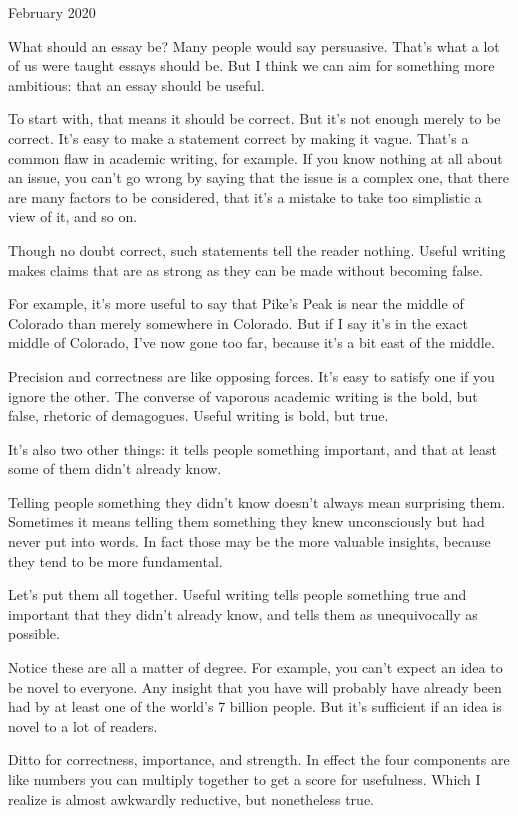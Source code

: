 February 2020

What should an essay be? Many people would say persuasive. That's what a
lot of us were taught essays should be. But I think we can aim for
something more ambitious: that an essay should be useful.

To start with, that means it should be correct. But it's not enough
merely to be correct. It's easy to make a statement correct by making it
vague. That's a common flaw in academic writing, for example. If you
know nothing at all about an issue, you can't go wrong by saying that
the issue is a complex one, that there are many factors to be
considered, that it's a mistake to take too simplistic a view of it, and
so on.

Though no doubt correct, such statements tell the reader nothing. Useful
writing makes claims that are as strong as they can be made without
becoming false.

For example, it's more useful to say that Pike's Peak is near the middle
of Colorado than merely somewhere in Colorado. But if I say it's in the
exact middle of Colorado, I've now gone too far, because it's a bit east
of the middle.

Precision and correctness are like opposing forces. It's easy to satisfy
one if you ignore the other. The converse of vaporous academic writing
is the bold, but false, rhetoric of demagogues. Useful writing is bold,
but true.

It's also two other things: it tells people something important, and
that at least some of them didn't already know.

Telling people something they didn't know doesn't always mean surprising
them. Sometimes it means telling them something they knew unconsciously
but had never put into words. In fact those may be the more valuable
insights, because they tend to be more fundamental.

Let's put them all together. Useful writing tells people something true
and important that they didn't already know, and tells them as
unequivocally as possible.

Notice these are all a matter of degree. For example, you can't expect
an idea to be novel to everyone. Any insight that you have will probably
have already been had by at least one of the world's 7 billion people.
But it's sufficient if an idea is novel to a lot of readers.

Ditto for correctness, importance, and strength. In effect the four
components are like numbers you can multiply together to get a score for
usefulness. Which I realize is almost awkwardly reductive, but
nonetheless true.


